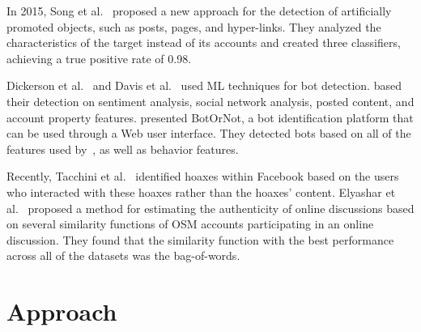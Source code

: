 \documentclass{sig-alternate}
\renewcommand{\tt}{\fontencoding{OT1}\fontfamily{cmtt}\selectfont}
\begin{document}
In 2015, Song et al.~\cite{song2015crowdtarget} proposed a new approach for the detection of artificially promoted objects, such as posts, pages, and hyper-links.
They analyzed the characteristics of the target instead of its accounts and created three classifiers, achieving a true positive rate of 0.98. 

Dickerson et al.~\cite{dickerson2014using} and Davis et al.~\cite{davis2016botornot} used ML techniques for bot detection. 
\cite{dickerson2014using} based their detection on sentiment analysis, social network analysis, posted content, and account property features.
\cite{davis2016botornot} presented BotOrNot, a bot identification platform that can be used through a Web user interface. 
They detected bots based on all of the features used by~\cite{dickerson2014using}, as well as behavior features.

Recently, Tacchini et al.~\cite{tacchini2017some} identified hoaxes within Facebook based on the users who interacted with these hoaxes rather than the hoaxes' content.
Elyashar et al.~\cite{elyashar2017measurement} proposed a method for estimating the authenticity of online discussions based on several similarity functions of OSM accounts participating in an online discussion.
They found that the similarity function with the best performance across all of the datasets was the bag-of-words.




\section{Approach}
\label{sec:approach}
\end{document}
